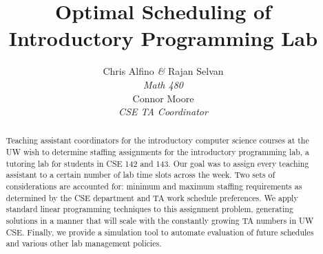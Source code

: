 \documentclass{article}
\begin{document}
\title{\textbf{Optimal Scheduling of Introductory Programming Lab}}
\author{
   Chris Alfino \textit{\&} Rajan Selvan\\
   \vspace{12pt}
   \small\textit{Math 480}\\
   Connor Moore\\
   \small\textit{CSE TA Coordinator}}
\date{}

\maketitle
\renewcommand{\abstractname}{}
\begin{abstract}
Teaching assistant coordinators for the introductory computer science courses at the UW wish to determine staffing assignments for the introductory programming lab, a tutoring lab for students in CSE 142 and 143. Our goal was to assign every teaching assistant to a certain number of lab time slots across the week. Two sets of considerations are accounted for: minimum and maximum staffing requirements as determined by the CSE department and TA work schedule preferences. We apply standard linear programming techniques to this assignment problem, generating solutions in a manner that will scale with the constantly growing TA numbers in UW CSE. Finally, we provide a simulation tool to automate evaluation of future schedules and various other lab management policies.
\end{abstract}

\noindent\makebox[\linewidth]{\rule{\textwidth}{0.4pt}}
\end{document}
